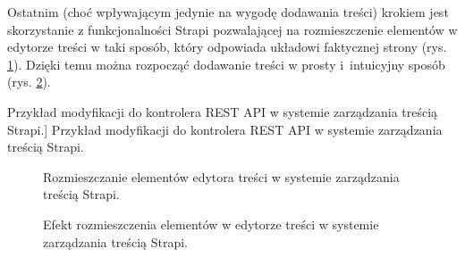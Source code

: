 \documentclass[a4paper, 12pt]{article}
\numberwithin{figure}{section}
\begin{document}
\begin{sloppypar}
Ostatnim (choć wpływającym jedynie na wygodę dodawania treści) krokiem jest skorzystanie z funkcjonalności Strapi pozwalającej na rozmieszczenie elementów w edytorze treści w taki sposób, który odpowiada układowi faktycznej strony (rys. \ref{fig:strapi-interface-3.jpg}). Dzięki temu można rozpocząć dodawanie treści w prosty i~intuicyjny sposób (rys. \ref{fig:strapi-interface-4.jpg}).

\begin{code}[htbp]
    
    \caption
    [Przykład modyfikacji do kontrolera REST API w systemie zarządzania treścią Strapi.]
    {Przykład modyfikacji do kontrolera REST API w systemie zarządzania treścią Strapi.}
    \label{chapter4:controller}
\end{code}

\begin{figure}[H] 
    \centering
   \caption{Rozmieszczanie elementów edytora treści w systemie zarządzania treścią Strapi.}
   \label{fig:strapi-interface-3.jpg}
\end{figure}

\begin{figure}[H] 
    \centering
   \caption{Efekt rozmieszczenia elementów w edytorze treści w systemie zarządzania treścią Strapi.}
   \label{fig:strapi-interface-4.jpg}
\end{figure}


\end{sloppypar}
\end{document}
